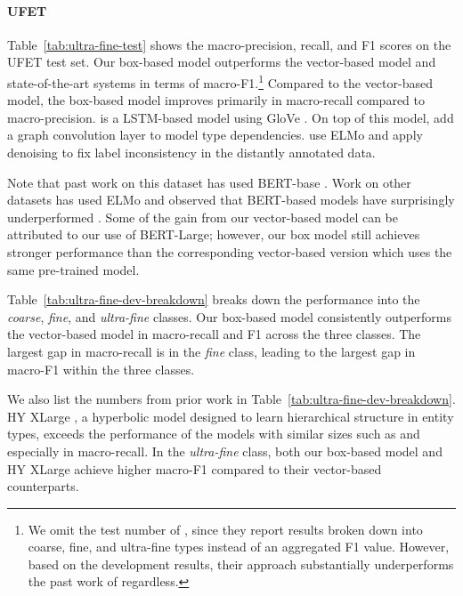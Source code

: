 \documentclass[11pt,a4paper]{article}
\begin{document}
\paragraph{UFET} Table~\ref{tab:ultra-fine-test} shows the macro-precision, recall, and F1 scores on the UFET test set. Our box-based model outperforms the vector-based model and state-of-the-art systems in terms of macro-F1.\footnote{We omit the test number of \citet{Federico_Lopez_20}, since they report results broken down into coarse, fine, and ultra-fine types instead of an aggregated F1 value. However, based on the development results, their approach substantially underperforms the past work of \citet{Yasumasa_Onoe_19} regardless.} Compared to the vector-based model, the box-based model improves primarily in macro-recall compared to macro-precision. \citet{Eunsol_Choi_18} is a LSTM-based model using GloVe \citep{Jeffrey_Pennington_14}. On top of this model, \citet{Wenhan_Xiong_19} add a graph convolution layer to model type dependencies. \citet{Yasumasa_Onoe_19} use ELMo \citep{Matthew_Peters_18} and apply denoising to fix label inconsistency in the distantly annotated data.


Note that past work on this dataset has used BERT-base \cite{Yasumasa_Onoe_19}. Work on other datasets has used ELMo and observed that BERT-based models have surprisingly underperformed \cite{Ying_Lin_19}. Some of the gain from our vector-based model can be attributed to our use of BERT-Large; however, our box model still achieves stronger performance than the corresponding vector-based version which uses the same pre-trained model.


Table~\ref{tab:ultra-fine-dev-breakdown} breaks down the performance into the \emph{coarse}, \emph{fine}, and \emph{ultra-fine} classes. Our box-based model consistently outperforms the vector-based model in macro-recall and F1 across the three classes. The largest gap in macro-recall is in the \emph{fine} class, leading to the largest gap in macro-F1 within the three classes.

We also list the numbers from prior work in Table~\ref{tab:ultra-fine-dev-breakdown}. HY XLarge \citep{Federico_Lopez_20}, a hyperbolic model designed to learn hierarchical structure in entity types, exceeds the performance of the models with similar sizes such as \citet{Eunsol_Choi_18} and \citet{Wenhan_Xiong_19} especially in macro-recall. In the \emph{ultra-fine} class, both our box-based model and HY XLarge achieve higher macro-F1 compared to their vector-based counterparts.
\end{document}
